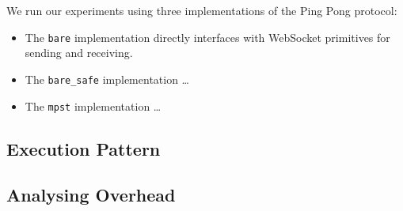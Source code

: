 We run our experiments using three implementations of the Ping Pong protocol:

\begin{itemize}

\item The \texttt{bare} implementation directly interfaces with 
WebSocket primitives for sending and receiving. 

\item The \texttt{bare_safe} implementation \dots

\item The \texttt{mpst} implementation \dots

\end{itemize}


\subsection{Execution Pattern}

\subsection{Analysing Overhead}
